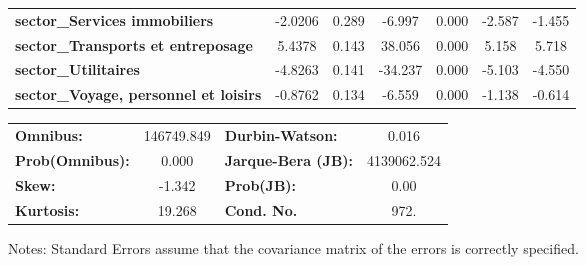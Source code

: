 \begin{center}
\begin{tabular}{lcccccc}
\textbf{sector\_Services immobiliers}                                 &      -2.0206  &        0.289     &    -6.997  &         0.000        &       -2.587    &       -1.455     \\
\textbf{sector\_Transports et entreposage}                            &       5.4378  &        0.143     &    38.056  &         0.000        &        5.158    &        5.718     \\
\textbf{sector\_Utilitaires}                                          &      -4.8263  &        0.141     &   -34.237  &         0.000        &       -5.103    &       -4.550     \\
\textbf{sector\_Voyage, personnel et loisirs}                         &      -0.8762  &        0.134     &    -6.559  &         0.000        &       -1.138    &       -0.614     \\
\bottomrule
\end{tabular}
\begin{tabular}{lclc}
\textbf{Omnibus:}       & 146749.849 & \textbf{  Durbin-Watson:     } &      0.016   \\
\textbf{Prob(Omnibus):} &    0.000   & \textbf{  Jarque-Bera (JB):  } & 4139062.524  \\
\textbf{Skew:}          &   -1.342   & \textbf{  Prob(JB):          } &       0.00   \\
\textbf{Kurtosis:}      &   19.268   & \textbf{  Cond. No.          } &       972.   \\
\bottomrule
\end{tabular}
\end{center}

Notes: \newline
 [1] Standard Errors assume that the covariance matrix of the errors is correctly specified.